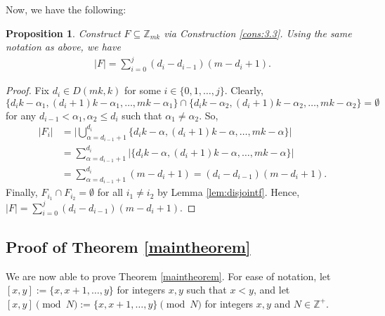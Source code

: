 \documentclass{article}
\newtheorem{proposition}[theorem]{Proposition}
\theoremstyle{definition}
\theoremstyle{remark}
\begin{document}
Now, we have the following:

\begin{proposition}
\label{prop:sizeoff}
    Construct $F \subseteq \mathbb{Z}_{mk}$ via Construction \ref{cons:3.3}. Using the same notation as above, we have \begin{align}
        |F| = \sum_{i=0}^{j}(d_i-d_{i-1})(m-d_i+1).
    \end{align}
\end{proposition}

\begin{proof}
    Fix $d_i \in D(mk,k)$ for some $i \in \{0,1,\ldots,j\}$. Clearly, \[\{d_ik-\alpha_1,(d_i+1)k-\alpha_1,\ldots,mk-\alpha_1\} \cap \{d_ik-\alpha_2,(d_i+1)k-\alpha_2,\ldots,mk-\alpha_2\} = \emptyset\] for any $d_{i-1} < \alpha_1,\alpha_2 \leq d_i$ such that $\alpha_1 \neq \alpha_2$. So, \begin{align*}
        |F_i| &= \Big|\bigcup_{\alpha=d_{i-1}+1}^{d_i}\{d_ik-\alpha,(d_i+1)k-\alpha,\ldots,mk-\alpha\}\Big| \\
        &= \sum_{\alpha=d_{i-1}+1}^{d_i}|\{d_{i}k-\alpha,(d_i+1)k-\alpha,\ldots,mk-\alpha\}| \\
        &= \sum_{\alpha=d_{i-1}+1}^{d_i}(m-d_i+1) = (d_{i}-d_{i-1})(m-d_{i}+1).
    \end{align*} Finally, $F_{i_1} \cap F_{i_2} = \emptyset$ for all $i_1 \neq i_2$ by Lemma \ref{lem:disjointf}. Hence, $|F| = \sum_{i=0}^{j}(d_i-d_{i-1})(m-d_i+1)$.
\end{proof}

\subsection{Proof of Theorem \ref{maintheorem}}

We are now able to prove Theorem \ref{maintheorem}. For ease of notation, let $[x,y] := \{x,x+1,\ldots,y\}$ for integers $x,y$ such that $x<y$, and let $[x,y] \pmod N := \{x,x+1,\ldots,y\} \pmod N$ for integers $x,y$ and $N \in \mathbb{Z}^+$.
\end{document}
